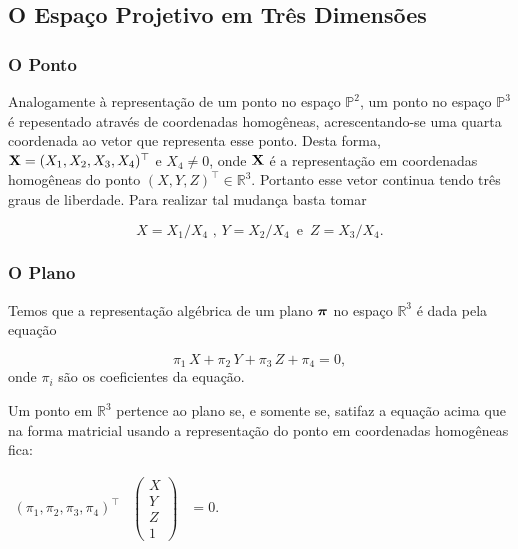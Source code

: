 \subsection{O Espaço Projetivo em Três Dimensões}\label{sec.espaco-P3}


\subsubsection{O Ponto} 


Analogamente à representação de um ponto no espaço $\mathbb{P}^2$, um ponto no espaço $\mathbb{P}^3$ é repesentado através de coordenadas homogêneas, acrescentando-se uma quarta coordenada ao vetor que representa esse ponto. Desta forma, $\mathbf{X} = (X_1,X_2,X_3,X_4)^\top$ e $X_4 \ne 0$, onde $\mathbf{X}$ é a representação em coordenadas homogêneas do ponto $(X,Y,Z)^\top \in \mathbb{R}^3$. Portanto esse vetor continua tendo três graus de liberdade. Para realizar tal mudança basta tomar 

\begin{equation*}
X=X_1/X_4 \,\, ,\, Y=X_2/X_4 \,\,\, \text{e} \,\,\, Z=X_3/X_4.
\end{equation*}

 

\subsubsection{ O Plano}

Temos que a representação algébrica de um plano $\boldsymbol{\pi}$ no espaço $\mathbb{R}^3$ é dada pela equação

\begin{equation*}
\pi_1\,X+\pi_2\,Y+\pi_3\,Z+\pi_4=0,
\end{equation*}
onde $\pi_i$ são os coeficientes da equação.

Um ponto em $\mathbb{R}^3$ pertence ao plano se, e somente se, satifaz a equação acima que na forma matricial usando a representação do ponto em coordenadas homogêneas fica:

\begin{center}
$
\begin{array}{ccc}
  (\pi_1,\pi_2,\pi_3,\pi_4)^\top
& \begin{pmatrix}
  X\\
  Y\\
  Z\\
  1
  \end{pmatrix}
& = 0.
\end{array}
$
\end{center}

